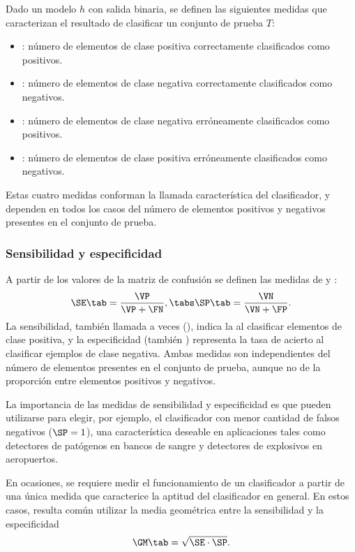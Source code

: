 Dado un modelo $h$ con salida binaria, se definen las siguientes
medidas que caracterizan el resultado de clasificar un conjunto de
prueba $T$:
%
\iflatexml\begin{itemize}\else\begin{itemize}[style=nextline]\fi
  \item{}: número de elementos de clase
    positiva correctamente clasificados como positivos.
  \item{}: número de elementos de clase
    negativa correctamente clasificados como negativos.
  \item{}: número de elementos de clase
    negativa erróneamente clasificados como positivos.
  \item{}: número de elementos de clase
    positiva erróneamente clasificados como negativos.
\end{itemize}
%
Estas cuatro medidas conforman la llamada 
característica del clasificador, y dependen en todos los casos del
número de elementos positivos y negativos presentes en el conjunto de
prueba.
%
\subsubsection{Sensibilidad y especificidad}
%
A partir de los valores de la matriz de confusión se definen las
medidas de  y :
%
\begin{align}
  \SE \tab = \frac{\VP}{\VP+\FN}, \tabs \SP \tab = \frac{\VN}{\VN+\FP}.
\end{align}
%
La sensibilidad, también llamada a veces  (), indica la  al clasificar
elementos de clase positiva, y la especificidad (también ) representa la tasa de acierto al clasificar
ejemplos de clase negativa.  Ambas medidas son independientes del
número de elementos presentes en el conjunto de prueba, aunque no de
la proporción entre elementos positivos y negativos.

La importancia de las medidas de sensibilidad y especificidad es que
pueden utilizarse para elegir, por ejemplo, el clasificador con menor
cantidad de falsos negativos ($\SP=1$), una característica deseable en
aplicaciones tales como detectores de patógenos en bancos de sangre y
detectores de explosivos en aeropuertos.

En ocasiones, se requiere medir el funcionamiento de un clasificador a
partir de una única medida que caracterice la aptitud del clasificador
en general. En estos casos, resulta común utilizar la media geométrica
entre la sensibilidad y la especificidad
%
\begin{align}
  \GM \tab = \sqrt{\SE\cdot\SP}.
\end{align}
%


\end{itemize}
